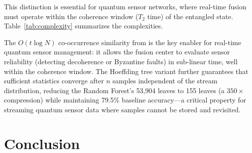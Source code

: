 \documentclass[twocolumn,11pt]{article}
\begin{document}
This distinction is essential for quantum sensor networks,
where real-time fusion must operate within the coherence
window ($T_2$ time) of the entangled state.
Table~\ref{tab:complexity} summarizes the complexities.

\begin{table}[H]
\centering
\caption{Computational complexity of fusion methods.
$M$: sensors, $N$: samples, $t$: trees, $m$: leaves,
$d$: state dimension.}
\label{tab:complexity}
\end{table}

The $O(t \log N)$ co-occurrence similarity from
\cite{iyer2019fast} is the key enabler for real-time quantum
sensor management: it allows the fusion center to evaluate
sensor reliability (detecting decoherence or Byzantine faults)
in sub-linear time, well within the coherence window.
The Hoeffding tree variant \cite{iyer2015ai} further guarantees
that sufficient statistics converge after $n$ samples
independent of the stream distribution, reducing the
Random Forest's 53{,}904 leaves to 155 leaves (a $350\times$
compression) while maintaining 79.5\% baseline accuracy---a
critical property for streaming quantum sensor data where
samples cannot be stored and revisited.


\section{Conclusion}
\label{sec:conclusion}
\end{document}
